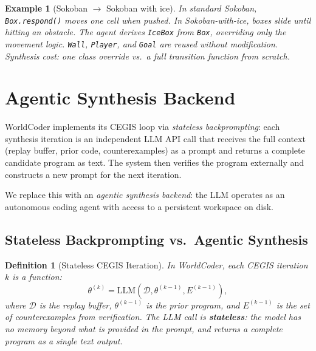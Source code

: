 \documentclass{article}
\newtheorem{definition}{Definition}
\newtheorem{example}{Example}
\newcommand{\calD}{\mathcal{D}}
\begin{document}
\begin{example}[Sokoban $\to$ Sokoban with ice]
\label{ex:transfer}
In standard Sokoban, \texttt{Box.respond()} moves one cell when pushed.  In
Sokoban-with-ice, boxes slide until hitting an obstacle.  The agent derives
\texttt{IceBox} from \texttt{Box}, overriding only the movement logic.
\texttt{Wall}, \texttt{Player}, and \texttt{Goal} are reused without
modification.  Synthesis cost: one class override vs.\ a full transition
function from scratch.
\end{example}



\section{Agentic Synthesis Backend}
\label{sec:agentic}

WorldCoder implements its CEGIS loop via \emph{stateless backprompting}: each
synthesis iteration is an independent LLM API call that receives the full
context (replay buffer, prior code, counterexamples) as a prompt and returns
a complete candidate program as text.  The system then verifies the program
externally and constructs a new prompt for the next iteration.

We replace this with an \emph{agentic synthesis backend}: the LLM operates as
an autonomous coding agent with access to a persistent workspace on disk.

\subsection{Stateless Backprompting vs.\ Agentic Synthesis}
\label{sec:stateless_vs_agentic}

\begin{definition}[Stateless CEGIS Iteration]
\label{def:stateless_cegis}
In WorldCoder, each CEGIS iteration $k$ is a function:
\begin{equation}
    \theta^{(k)} = \text{LLM}(\calD, \theta^{(k-1)}, E^{(k-1)}),
\end{equation}
where $\calD$ is the replay buffer, $\theta^{(k-1)}$ is the prior program, and
$E^{(k-1)}$ is the set of counterexamples from verification.  The LLM call is
\textbf{stateless}: the model has no memory beyond what is provided in the
prompt, and returns a complete program as a single text output.
\end{definition}
\end{document}
